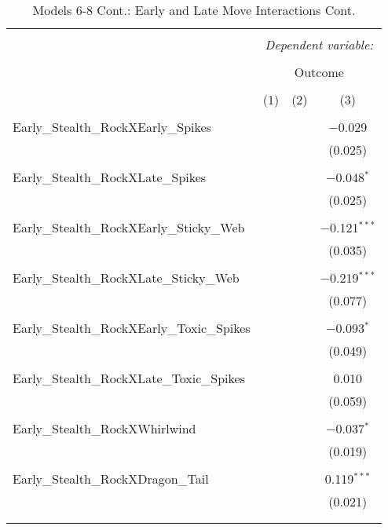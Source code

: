 \documentclass[12pt,twoside]{reedthesis}
\begin{document}
  \begin{table}[!htbp] \centering 
    \caption{Models 6-8 Cont.: Early and Late Move Interactions Cont.} 
    \label{} 
  \begin{tabular}{@{\extracolsep{5pt}}lccc} 
  \\[-1.8ex]\hline 
  \hline \\[-1.8ex] 
   & \multicolumn{3}{c}{\textit{Dependent variable:}} \\ 
  \cline{2-4} 
  \\[-1.8ex] & \multicolumn{3}{c}{Outcome} \\ 
  \\[-1.8ex] & (1) & (2) & (3)\\ 
  \hline \\[-1.8ex] 
   Early\_Stealth\_RockXEarly\_Spikes &  &  & $-$0.029 \\ 
    &  &  & (0.025) \\ 
    & & & \\ 
   Early\_Stealth\_RockXLate\_Spikes &  &  & $-$0.048$^{*}$ \\ 
    &  &  & (0.025) \\ 
    & & & \\ 
   Early\_Stealth\_RockXEarly\_Sticky\_Web &  &  & $-$0.121$^{***}$ \\ 
    &  &  & (0.035) \\ 
    & & & \\ 
   Early\_Stealth\_RockXLate\_Sticky\_Web &  &  & $-$0.219$^{***}$ \\ 
    &  &  & (0.077) \\ 
    & & & \\ 
   Early\_Stealth\_RockXEarly\_Toxic\_Spikes &  &  & $-$0.093$^{*}$ \\ 
    &  &  & (0.049) \\ 
    & & & \\ 
   Early\_Stealth\_RockXLate\_Toxic\_Spikes &  &  & 0.010 \\ 
    &  &  & (0.059) \\ 
    & & & \\ 
   Early\_Stealth\_RockXWhirlwind &  &  & $-$0.037$^{*}$ \\ 
    &  &  & (0.019) \\ 
    & & & \\ 
   Early\_Stealth\_RockXDragon\_Tail &  &  & 0.119$^{***}$ \\ 
    &  &  & (0.021) \\ 
    & & & \\ 
  \hline \\[-1.8ex] 

\end{tabular}
\end{table}
\end{document}
